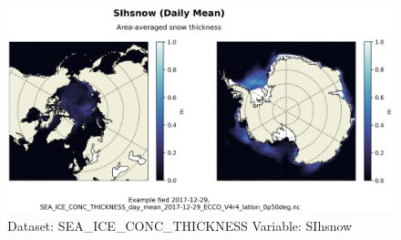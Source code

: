 \begin{figure}[H]
\centering
\includegraphics[scale=0.55]{../images/plots/latlon_plots/Sea-Ice_and_Snow_Concentration_and_Thickness/SIhsnow.png}
\caption{Dataset: SEA\_ICE\_CONC\_THICKNESS Variable: SIhsnow}
\label{tab:table-SEA_ICE_CONC_THICKNESS_SIhsnow-Plot}
\end{figure}
\pagebreak
